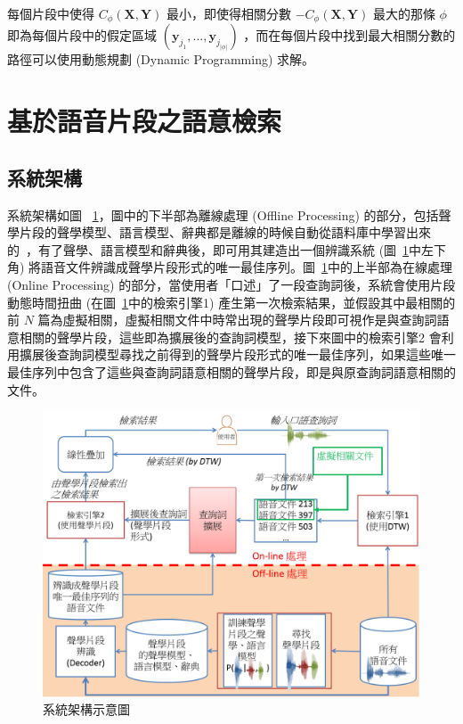 每個片段中使得 $C_{\phi}(\mathbf{X}, \mathbf{Y})$ 最小，即使得相關分數 $-C_{\phi}(\mathbf{X}, \mathbf{Y})$ 最大的那條 $\phi$ 即為每個片段中的假定區域 $(\mathbf{y}_{j_1},...,\mathbf{y}_{j_{|\phi|}})$ ，而在每個片段中找到最大相關分數的路徑可以使用動態規劃 (Dynamic Programming) 求解。

\section{基於語音片段之語意檢索}
\subsection{系統架構}
系統架構如圖 ~\ref{fig:chap4_system}，圖中的下半部為離線處理 (Offline Processing) 的部分，包括聲學片段的聲學模型、語言模型、辭典都是離線的時候自動從語料庫中學習出來的~\cite{chung2013unsupervised}，有了聲學、語言模型和辭典後，即可用其建造出一個辨識系統 (圖~\ref{fig:chap4_system}中左下角) 將語音文件辨識成聲學片段形式的唯一最佳序列。圖~\ref{fig:chap4_system}中的上半部為在線處理 (Online Processing)
的部分，當使用者「口述」了一段查詢詞後，系統會使用片段動態時間扭曲 (在圖~\ref{fig:chap4_system}中的檢索引擎1) 產生第一次檢索結果，並假設其中最相關的前 $N$ 篇為虛擬相關，虛擬相關文件中時常出現的聲學片段即可視作是與查詢詞語意相關的聲學片段，這些即為擴展後的查詢詞模型，接下來圖中的檢索引擎2 會利用擴展後查詢詞模型尋找之前得到的聲學片段形式的唯一最佳序列，如果這些唯一最佳序列中包含了這些與查詢詞語意相關的聲學片段，即是與原查詢詞語意相關的文件。

\begin{figure}
\centering
\includegraphics[scale=0.5]{images/chap4_system_zh.png}
\caption{系統架構示意圖} \label{fig:chap4_system}
\end{figure}


